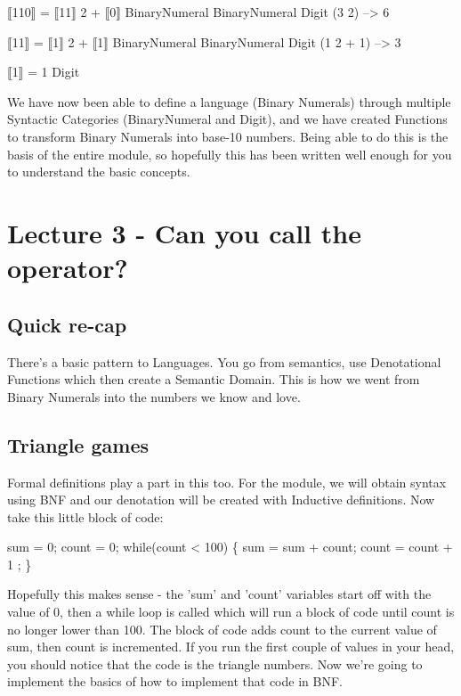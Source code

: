 \documentclass[12pt]{article}
\begin{document}
⟦110⟧               = ⟦11⟧              \texttimes{} 2 + ⟦0⟧
      BinaryNumeral      BinaryNumeral          Digit (3 \texttimes{} 2)     --> 6

⟦11⟧                = ⟦1⟧               \texttimes{} 2 + ⟦1⟧
      BinaryNumeral     BinaryNumeral           Digit (1 \texttimes{} 2 + 1) --> 3

⟦1⟧              = 1
   Digit

We have now been able to define a language (Binary Numerals) through multiple
Syntactic Categories (BinaryNumeral and Digit), and we have created Functions
to transform Binary Numerals into base-10 numbers.  Being able to do this is
the basis of the entire module, so hopefully this has been written well enough
for you to understand the basic concepts.

\section{Lecture 3 - Can you call the operator?}
\label{sec-3}

\subsection{Quick re-cap}
\label{sec-3-1}
There's a basic pattern to Languages.  You go from semantics, use Denotational
Functions which then create a Semantic Domain.  This is how we went from Binary
Numerals into the numbers we know and love.

\subsection{Triangle games}
\label{sec-3-2}
Formal definitions play a part in this too.  For the module, we will obtain
syntax using BNF and our denotation will be created with Inductive definitions.
Now take this little block of code:

sum   = 0;
count = 0;
while(count < 100) \{
  sum   = sum   + count;
  count = count + 1    ;
\}

Hopefully this makes sense - the 'sum' and 'count' variables start off with the
value of 0, then a while loop is called which will run a block of code until
count is no longer lower than 100.  The block of code adds count to the current
value of sum, then count is incremented.  If you run the first couple of values
in your head, you should notice that the code is the triangle numbers.  Now
we're going to implement the basics of how to implement that code in BNF.
\end{document}
